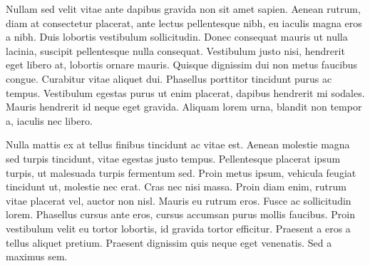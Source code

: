 
Nullam sed velit vitae ante dapibus gravida non sit amet sapien. Aenean rutrum, diam at consectetur placerat, ante lectus pellentesque nibh, eu iaculis magna eros a nibh. Duis lobortis vestibulum sollicitudin. Donec consequat mauris ut nulla lacinia, suscipit pellentesque nulla consequat. Vestibulum justo nisi, hendrerit eget libero at, lobortis ornare mauris. Quisque dignissim dui non metus faucibus congue. Curabitur vitae aliquet dui. Phasellus porttitor tincidunt purus ac tempus. Vestibulum egestas purus ut enim placerat, dapibus hendrerit mi sodales. Mauris hendrerit id neque eget gravida. Aliquam lorem urna, blandit non tempor a, iaculis nec libero.

Nulla mattis ex at tellus finibus tincidunt ac vitae est. Aenean molestie magna sed turpis tincidunt, vitae egestas justo tempus. Pellentesque placerat ipsum turpis, ut malesuada turpis fermentum sed. Proin metus ipsum, vehicula feugiat tincidunt ut, molestie nec erat. Cras nec nisi massa. Proin diam enim, rutrum vitae placerat vel, auctor non nisl. Mauris eu rutrum eros. Fusce ac sollicitudin lorem. Phasellus cursus ante eros, cursus accumsan purus mollis faucibus. Proin vestibulum velit eu tortor lobortis, id gravida tortor efficitur. Praesent a eros a tellus aliquet pretium. Praesent dignissim quis neque eget venenatis. Sed a maximus sem.
